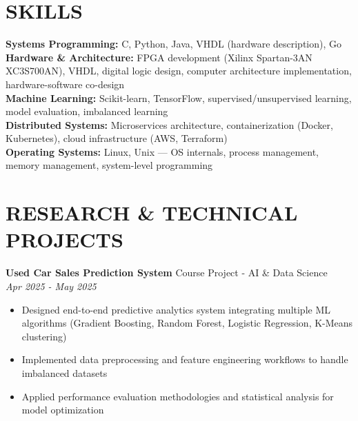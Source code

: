 \documentclass[10pt,a4paper]{article}
\newcommand{\experienceheader}[4]{
    \textbf{#1} \hfill #2 \\
    \textit{#3} \hfill \textit{#4}
}
\begin{document}
\section*{SKILLS}

\textbf{Systems Programming:} C, Python, Java, VHDL (hardware description), Go \\
\textbf{Hardware \& Architecture:} FPGA development (Xilinx Spartan-3AN XC3S700AN), VHDL, digital logic design, computer architecture implementation, hardware-software co-design \\
\textbf{Machine Learning:} Scikit-learn, TensorFlow, supervised/unsupervised learning, model evaluation, imbalanced learning \\
\textbf{Distributed Systems:} Microservices architecture, containerization (Docker, Kubernetes), cloud infrastructure (AWS, Terraform) \\
\textbf{Operating Systems:} Linux, Unix — OS internals, process management, memory management, system-level programming

\section*{RESEARCH \& TECHNICAL PROJECTS}

\experienceheader{Used Car Sales Prediction System}{Course Project - AI \& Data Science}{}{Apr 2025 - May 2025}
\begin{itemize}[leftmargin=*, itemsep=1pt, topsep=1pt]
    \item Designed end-to-end predictive analytics system integrating multiple ML algorithms (Gradient Boosting, Random Forest, Logistic Regression, K-Means clustering)
    \item Implemented data preprocessing and feature engineering workflows to handle imbalanced datasets
    \item Applied performance evaluation methodologies and statistical analysis for model optimization
\end{itemize}
\end{document}
